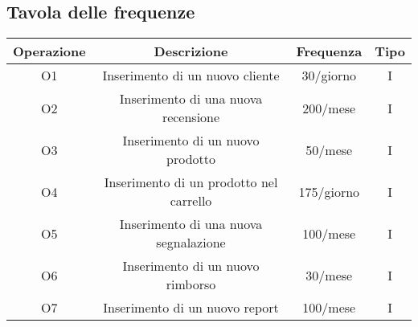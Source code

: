 \subsection{Tavola delle frequenze}
\begin{center}
\begin{tabular}{ |c|c|c|c|} 
\hline
Operazione & Descrizione & Frequenza & Tipo \\
\hline
\multirow{3}{6em}{O1} & \multirow{3}{12em}{Inserimento di un nuovo cliente} & \multirow{3}{8em}{30/giorno} & \multirow{3}{5em}{I}\\
 & & &\\
 & & &\\
\hline

\multirow{3}{6em}{O2} & \multirow{3}{12em}{Inserimento di una nuova recensione} & \multirow{3}{8em}{200/mese} & \multirow{3}{5em}{I}\\
 & & &\\
 & & &\\
 \hline

\multirow{3}{6em}{O3} & \multirow{3}{12em}{Inserimento di un nuovo prodotto} & \multirow{3}{8em}{50/mese} & \multirow{3}{5em}{I}\\
 & & &\\
 & & &\\
\hline

\multirow{3}{6em}{O4} & \multirow{3}{12em}{Inserimento di un prodotto nel carrello} & \multirow{3}{8em}{175/giorno} & \multirow{3}{5em}{I}\\
 & & &\\
 & & &\\
\hline

\multirow{3}{6em}{O5} & \multirow{3}{12em}{Inserimento di una nuova segnalazione} & \multirow{3}{8em}{100/mese} & \multirow{3}{5em}{I}\\
 & & &\\
 & & &\\
\hline

\multirow{3}{6em}{O6} & \multirow{3}{12em}{Inserimento di un nuovo rimborso} & \multirow{3}{8em}{30/mese} & \multirow{3}{5em}{I}\\
 & & &\\
 & & &\\
\hline

\multirow{3}{6em}{O7} & \multirow{3}{12em}{Inserimento di un nuovo report} & \multirow{3}{8em}{100/mese} & \multirow{3}{5em}{I}\\
 & & &\\
 & & &\\
\hline


\end{tabular}
\end{center}
